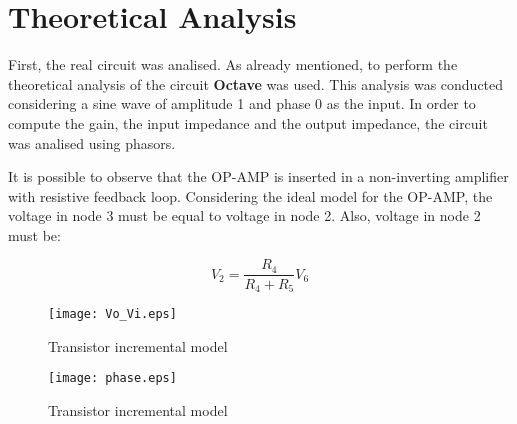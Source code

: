 \newpage
\section{Theoretical Analysis}
\label{sec:analysis}



First, the real circuit was analised. As already mentioned, to perform the theoretical analysis of the circuit {\bf Octave} was used. This analysis was conducted considering a sine wave of amplitude 1 and phase 0 as the input. In order to compute the gain, the input impedance and the output impedance, the circuit was analised using phasors.

It is possible to observe that the OP-AMP is inserted in a non-inverting amplifier with resistive feedback loop. Considering the ideal model for the OP-AMP, the voltage in node 3 must be equal to voltage in node 2. Also, voltage in node 2 must be:

\begin{equation}
        V_2 = \frac{R_4}{R_4+R_5}V_6
\end{equation}

\begin{figure}[H]
        \centering
        \texttt{[image: Vo\_Vi.eps]}
        \caption{Transistor incremental model}
        \label{transistorinc}
\end{figure}

\begin{figure}[H]
        \centering
        \texttt{[image: phase.eps]}
        \caption{Transistor incremental model}
        \label{transistorinc}
\end{figure}
